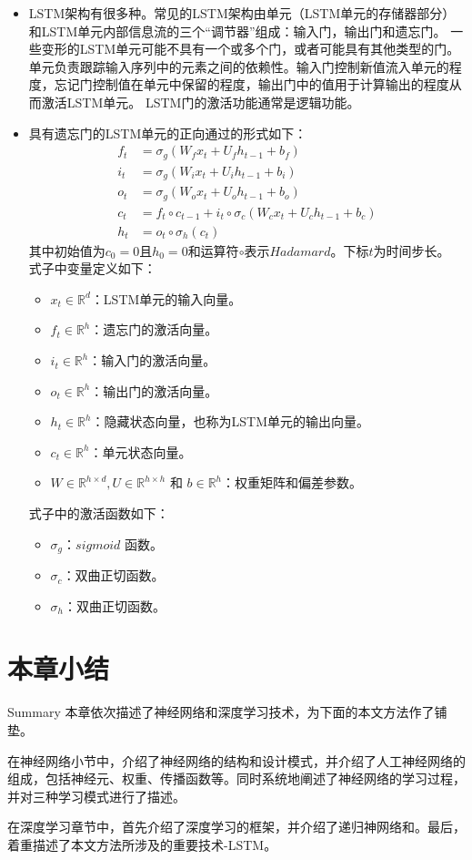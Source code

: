 \begin{itemize}
  \item LSTM架构有很多种。常见的LSTM架构由单元（LSTM单元的存储器部分）和LSTM单元内部信息流的三个“调节器”组成：输入门，输出门和遗忘门。 一些变形的LSTM单元可能不具有一个或多个门，或者可能具有其他类型的门。单元负责跟踪输入序列中的元素之间的依赖性。输入门控制新值流入单元的程度，忘记门控制值在单元中保留的程度，输出门中的值用于计算输出的程度从而激活LSTM单元。 LSTM门的激活功能通常是逻辑功能。
  \item 具有遗忘门的LSTM单元的正向通过的形式如下：
  \begin{equation}
    \begin{aligned} f_{t} &=\sigma_{g}\left(W_{f} x_{t}+U_{f} h_{t-1}+b_{f}\right) \\ i_{t} &=\sigma_{g}\left(W_{i} x_{t}+U_{i} h_{t-1}+b_{i}\right) \\ o_{t} &=\sigma_{g}\left(W_{o} x_{t}+U_{o} h_{t-1}+b_{o}\right) \\ c_{t} &=f_{t} \circ c_{t-1}+i_{t} \circ \sigma_{c}\left(W_{c} x_{t}+U_{c} h_{t-1}+b_{c}\right) \\ h_{t} &=o_{t} \circ \sigma_{h}\left(c_{t}\right) \end{aligned}
  \end{equation}其中初始值为$c_ {0} = 0$且$h_ {0} = 0$和运算符$\circ$表示$Hadamard$。下标$t$为时间步长。
  式子中变量定义如下：
  \begin{itemize}
    \item $x_{t} \in \mathbb{R}^{d}$：LSTM单元的输入向量。
    \item $f_{t} \in \mathbb{R}^{h}$：遗忘门的激活向量。
    \item $i_{t} \in \mathbb{R}^{h}$：输入门的激活向量。
    \item $o_{t} \in \mathbb{R}^{h}$：输出门的激活向量。
    \item $h_{t} \in \mathbb{R}^{h}$：隐藏状态向量，也称为LSTM单元的输出向量。
    \item $c_{t} \in \mathbb{R}^{h}$：单元状态向量。
    \item $W \in \mathbb{R}^{h \times d}, U \in \mathbb{R}^{h \times h}$ 和 $b \in \mathbb{R}^{h}$：权重矩阵和偏差参数。
  \end{itemize}
  式子中的激活函数如下：
  \begin{itemize}
    \item $\sigma_{g}$：$sigmoid$ 函数。
    \item $\sigma_{c}$：双曲正切函数。
    \item $\sigma_{h}$：双曲正切函数。
  \end{itemize}
\end{itemize}
\section{本章小结}{Summary}
本章依次描述了神经网络和深度学习技术，为下面的本文方法作了铺垫。

在神经网络小节中，介绍了神经网络的结构和设计模式，并介绍了人工神经网络的组成，包括神经元、权重、传播函数等。同时系统地阐述了神经网络的学习过程，并对三种学习模式进行了描述。

在深度学习章节中，首先介绍了深度学习的框架，并介绍了递归神网络和。最后，着重描述了本文方法所涉及的重要技术-LSTM。
